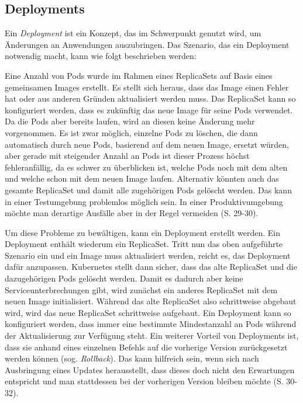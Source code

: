 \documentclass[11pt,a4paper]{article}
\begin{document}
\subsection{Deployments}
\label{sec:Deployments}
Ein \emph{Deployment} ist ein Konzept, das im Schwerpunkt genutzt wird, um Änderungen an Anwendungen auszubringen.
Das Szenario, das ein Deployment notwendig macht, kann wie folgt beschrieben werden:

Eine Anzahl von Pods wurde im Rahmen eines ReplicaSets auf Basis eines gemeinsamen Images erstellt.
Es stellt sich heraus, dass das Image einen Fehler hat oder aus anderen Gründen aktualisiert werden muss.
Das ReplicaSet kann so konfiguriert werden, dass es zukünftig das neue Image für seine Pods verwendet.
Da die Pods aber bereits laufen, wird an diesen keine Änderung mehr vorgenommen. Es ist zwar möglich,
einzelne Pods zu löschen, die dann automatisch durch neue Pods, basierend auf dem neuen Image, ersetzt würden, aber
gerade mit steigender Anzahl an Pods ist dieser Prozess höchst
fehleranfällig, da es schwer zu überblicken ist, welche Pods noch mit dem alten und welche schon mit dem
neuen Image laufen. Alternativ könnten auch das gesamte ReplicaSet und damit alle zugehörigen Pods gelöscht werden.
Das kann in einer Testumgebung problemlos möglich sein. In einer Produktivumgebung möchte man derartige
Ausfälle aber in der Regel vermeiden \cite{Schmeling_Dargatz_2022} (S. 29-30).

Um diese Probleme zu bewältigen, kann ein Deployment erstellt werden.
Ein Deployment enthält wiederum ein ReplicaSet. Tritt nun das oben aufgeführte Szenario ein und ein Image
muss aktualisiert werden, reicht es, das Deployment dafür anzupassen.
Kubernetes stellt dann sicher, dass das alte ReplicaSet und die dazugehörigen Pods gelöscht werden.
Damit es dadurch aber keine Serviceunterbrechungen gibt, wird zunächst ein anderes ReplicaSet mit dem neuen
Image initialisiert. Während das alte ReplicaSet also schrittweise abgebaut wird, wird das neue ReplicaSet
schrittweise aufgebaut. Ein Deployment kann so konfiguriert werden, dass immer eine bestimmte Mindestanzahl an
Pods während der Aktualisierung zur Verfügung steht.
Ein weiterer Vorteil von Deployments ist, dass sie anhand eines einzelnen Befehls auf die vorherige Version
zurückgesetzt werden können (sog. \emph{Rollback}). Das kann hilfreich sein, wenn sich nach Ausbringung eines
Updates herausstellt, dass dieses doch nicht den Erwartungen entspricht und man stattdessen bei der vorherigen
Version bleiben möchte \cite{Schmeling_Dargatz_2022} (S. 30-32).
\end{document}
